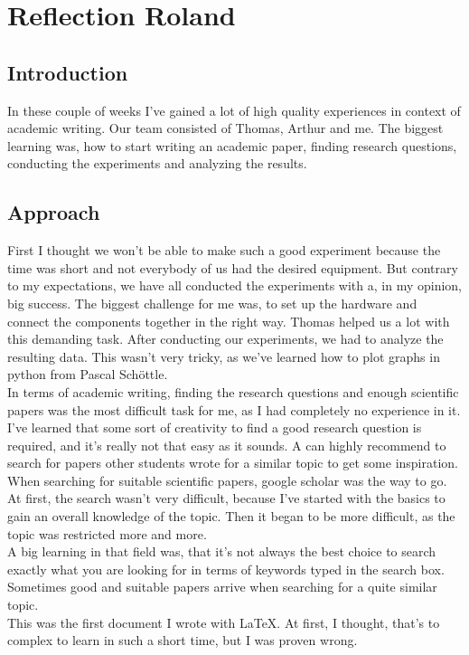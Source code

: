 \chapter*{Reflection Roland}


\section*{Introduction}
In these couple of weeks I've gained a lot of high quality experiences in context of academic writing. Our team consisted of Thomas, Arthur and me. 
The biggest learning was, how to start writing an academic paper, finding research questions, conducting the experiments and analyzing the results. 


\section*{Approach}
First I thought we won't be able to make such a good experiment because the time was short and not everybody of us had the desired equipment.
But contrary to my expectations, we have all conducted the experiments with a, in my opinion, big success.
The biggest challenge for me was, to set up the hardware and connect the components together in the right way. 
Thomas helped us a lot with this demanding task. After conducting our experiments, we had to analyze the resulting data. 
This wasn't very tricky, as we've learned how to plot graphs in python from Pascal Schöttle.\\ 
In terms of academic writing, finding the research questions and enough scientific papers was the most difficult task for me, as I had completely no experience in it. 
I've learned that some sort of creativity to find a good research question is required, and it's really not that easy as it sounds. 
A can highly recommend to search for papers other students wrote for a similar topic to get some inspiration. When searching for suitable scientific papers, google scholar was the way to go. 
At first, the search wasn't very difficult, because I've started with the basics to gain an overall knowledge of the topic. 
Then it began to be more difficult, as the topic was restricted more and more.\\ 
A big learning in that field was, that it's not always the best choice to search exactly what you are looking for in terms of keywords typed in the search box. 
Sometimes good and suitable papers arrive when searching for a quite similar topic. \\
This was the first document I wrote with LaTeX. At first, I thought, that's to complex to learn in such a short time, but I was proven wrong. 
